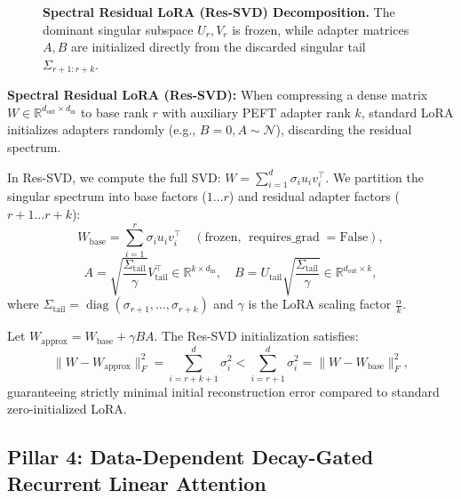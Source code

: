 \begin{figure}[t]
\centering
\caption{\textbf{Spectral Residual LoRA (Res-SVD) Decomposition.} The dominant singular subspace $U_r, V_r$ is frozen, while adapter matrices $A, B$ are initialized directly from the discarded singular tail $\Sigma_{r+1 : r+k}$.}
\label{fig:res_svd_diag}
\end{figure}

\textbf{Spectral Residual LoRA (Res-SVD):} When compressing a dense matrix $W \in \mathbb{R}^{d_{\text{out}} \times d_{\text{in}}}$ to base rank $r$ with auxiliary PEFT adapter rank $k$, standard LoRA initializes adapters randomly (e.g., $B=0, A \sim \mathcal{N}$), discarding the residual spectrum.

In Res-SVD, we compute the full SVD: $W = \sum_{i=1}^d \sigma_i u_i v_i^\top$. We partition the singular spectrum into base factors ($1 \dots r$) and residual adapter factors ($r+1 \dots r+k$):
\begin{equation}
W_{\text{base}} = \sum_{i=1}^r \sigma_i u_i v_i^\top \quad (\text{frozen, } \operatorname{requires\_grad}=\text{False}),
\end{equation}
\begin{equation}
A = \sqrt{\frac{\Sigma_{\text{tail}}}{\gamma}} V_{\text{tail}}^\top \in \mathbb{R}^{k \times d_{\text{in}}}, \quad B = U_{\text{tail}} \sqrt{\frac{\Sigma_{\text{tail}}}{\gamma}} \in \mathbb{R}^{d_{\text{out}} \times k},
\end{equation}
where $\Sigma_{\text{tail}} = \operatorname{diag}(\sigma_{r+1}, \dots, \sigma_{r+k})$ and $\gamma$ is the LoRA scaling factor $\frac{\alpha}{k}$.

\begin{theorem}
Let $W_{\text{approx}} = W_{\text{base}} + \gamma B A$. The Res-SVD initialization satisfies:
\begin{equation}
\|W - W_{\text{approx}}\|_F^2 = \sum_{i=r+k+1}^d \sigma_i^2 < \sum_{i=r+1}^d \sigma_i^2 = \|W - W_{\text{base}}\|_F^2,
\end{equation}
guaranteeing strictly minimal initial reconstruction error compared to standard zero-initialized LoRA.
\end{theorem}


\subsection{Pillar 4: Data-Dependent Decay-Gated Recurrent Linear Attention}
\label{sec:decay_attention}

